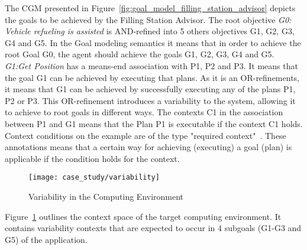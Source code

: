 The CGM presented in Figure~\ref{fig:goal_model_filling_station_advisor} depicts the goals to be achieved by the Filling Station Advisor.
The root objective \emph{G0: Vehicle refueling is assisted} is AND-refined into 5 others objectives G1, G2, G3, G4 and G5. In the Goal modeling semantics it means that in order to achieve the root Goal G0, the agent should achieve the goals G1, G2, G3, G4 and G5.
\emph{G1:Get Position} has a means-end association with P1, P2 and P3. It means that the goal G1 can be achieved by executing that plans. As it is an OR-refinements, it means that G1 can be achieved by successfully executing any of the plans P1, P2 or P3. This OR-refinement introduces a variability to the system, allowing it to achieve to root goals in different ways. The contexts C1 in the association between P1 and G1 means that the Plan P1 is executable if the context C1 holds.
Context conditions on the example are of the type "required context"~\cite{ali_goal-based_2010}. These annotations means that a certain way for achieving (executing) a goal (plan) is applicable if the condition holds for the context.

\begin{figure}[!htb]
 \centering
 \texttt{[image: case\_study/variability]}
 \caption{Variability in the Computing Environment}
\label{fig:variability}
\end{figure}

Figure~\ref{fig:variability} outlines the context space of the target computing environment. It contains variability contexts that are expected to occur in 4 subgoals (G1-G3 and G5) of the application.
